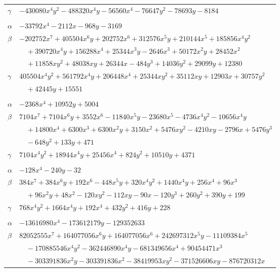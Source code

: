 \documentclass[11pt]{article}
\begin{document}
\begin{longtable}{@{}ll@{}}
$\gamma$ & $-430080x^{4}y^{2}-488320x^{4}y-56560x^{4}-76647y^{2}-78693y-8184$\\
\addlinespace[3pt]
\multicolumn{2}{@{}l}{$\{i,j\}=\{15,75\}$, $k_{ij}=2$}\\
$\alpha$ & $-33792x^{4}-2112x-968y-3169$\\
$\beta$ & $-202752x^{7}+405504x^{6}y+202752x^{6}+312576x^{5}y+210144x^{5}+185856x^{4}y^{2}$\\
 & $\quad +390720x^{4}y+156288x^{4}+25344x^{3}y-2646x^{3}+50172x^{2}y+28452x^{2}$\\
 & $\quad +11858xy^{2}+48038xy+26344x-484y^{3}+14036y^{2}+29099y+12380$\\
$\gamma$ & $405504x^{4}y^{2}+561792x^{4}y+206448x^{4}+25344xy^{2}+35112xy+12903x+30757y^{2}$\\
 & $\quad +42445y+15551$\\
\addlinespace[3pt]
\multicolumn{2}{@{}l}{$\{i,j\}=\{16,63\}$, $k_{ij}=2\cdot 3^{4}$}\\
$\alpha$ & $-2368x^{4}+10952y+5004$\\
$\beta$ & $7104x^{7}+7104x^{6}y+3552x^{6}-11840x^{5}y-23680x^{5}-4736x^{4}y^{2}-10656x^{4}y$\\
 & $\quad +14800x^{4}+6300x^{3}+6300x^{2}y+3150x^{2}+5476xy^{2}-4210xy-2796x+5476y^{3}$\\
 & $\quad -648y^{2}+133y+471$\\
$\gamma$ & $7104x^{4}y^{2}+18944x^{4}y+25456x^{4}+824y^{2}+10510y+4371$\\
\addlinespace[3pt]
\multicolumn{2}{@{}l}{$\{i,j\}=\{16,68\}$, $k_{ij}=3^{2}\cdot 5^{2}$}\\
$\alpha$ & $-128x^{4}-240y-32$\\
$\beta$ & $384x^{7}+384x^{6}y+192x^{6}-448x^{5}y+320x^{4}y^{2}+1440x^{4}y+256x^{4}+96x^{3}$\\
 & $\quad +96x^{2}y+48x^{2}-120xy^{2}-112xy-90x-120y^{3}+260y^{2}+390y+199$\\
$\gamma$ & $768x^{4}y^{2}+1664x^{4}y+192x^{4}+432y^{2}+416y+228$\\
\addlinespace[3pt]
\multicolumn{2}{@{}l}{$\{i,j\}=\{17,64\}$, $k_{ij}=3^{2}\cdot 5^{2}\cdot 17$}\\
$\alpha$ & $-13616980x^{4}-173612179y-129352633$\\
$\beta$ & $82052555x^{7}+164077056x^{6}y+164077056x^{6}+242697312x^{5}y-11109384x^{5}$\\
 & $\quad -170885546x^{4}y^{2}-362446890x^{4}y-681349656x^{4}+90454471x^{3}$\\
 & $\quad -303391836x^{2}y-303391836x^{2}-38419953xy^{2}-371526606xy-876720312x$\\

\end{longtable}
\end{document}
